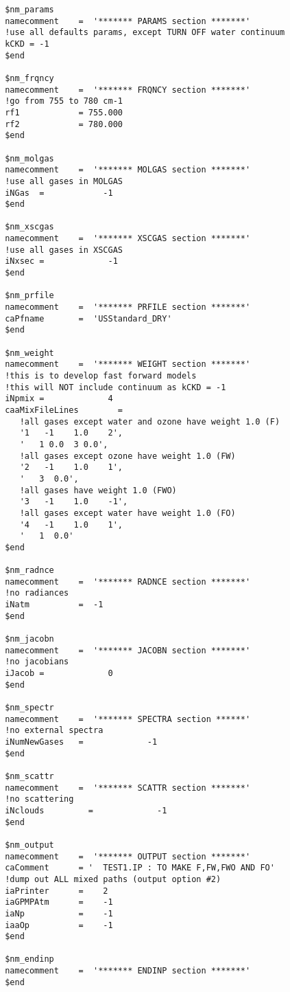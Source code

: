 \documentclass[11pt]{article}
\begin{document}
\begin{verbatim}
 $nm_params
 namecomment    =  '******* PARAMS section *******'
 !use all defaults params, except TURN OFF water continuum
 kCKD = -1
 $end

 $nm_frqncy
 namecomment    =  '******* FRQNCY section *******'
 !go from 755 to 780 cm-1
 rf1            = 755.000
 rf2            = 780.000
 $end

 $nm_molgas
 namecomment    =  '******* MOLGAS section *******'
 !use all gases in MOLGAS
 iNGas  =            -1
 $end

 $nm_xscgas
 namecomment    =  '******* XSCGAS section *******'
 !use all gases in XSCGAS
 iNxsec =             -1
 $end

 $nm_prfile
 namecomment    =  '******* PRFILE section *******'
 caPfname       =  'USStandard_DRY'
 $end

 $nm_weight
 namecomment    =  '******* WEIGHT section *******'
 !this is to develop fast forward models
 !this will NOT include continuum as kCKD = -1
 iNpmix =             4
 caaMixFileLines        = 
    !all gases except water and ozone have weight 1.0 (F)
    '1   -1    1.0    2',
    '   1 0.0  3 0.0',
    !all gases except ozone have weight 1.0 (FW)
    '2   -1    1.0    1',
    '   3  0.0', 
    !all gases have weight 1.0 (FWO)
    '3   -1    1.0    -1',
    !all gases except water have weight 1.0 (FO)
    '4   -1    1.0    1',
    '   1  0.0' 
 $end

 $nm_radnce
 namecomment    =  '******* RADNCE section *******'
 !no radiances
 iNatm          =  -1
 $end

 $nm_jacobn
 namecomment    =  '******* JACOBN section *******'
 !no jacobians
 iJacob =             0
 $end

 $nm_spectr
 namecomment    =  '******* SPECTRA section ******'
 !no external spectra
 iNumNewGases   =             -1
 $end

 $nm_scattr
 namecomment    =  '******* SCATTR section *******'
 !no scattering
 iNclouds         =             -1
 $end

 $nm_output
 namecomment    =  '******* OUTPUT section *******'
 caComment      = '  TEST1.IP : TO MAKE F,FW,FWO AND FO'
 !dump out ALL mixed paths (output option #2)
 iaPrinter      =    2
 iaGPMPAtm      =    -1
 iaNp           =    -1
 iaaOp          =    -1
 $end

 $nm_endinp
 namecomment    =  '******* ENDINP section *******'
 $end
\end{verbatim}
\end{document}
